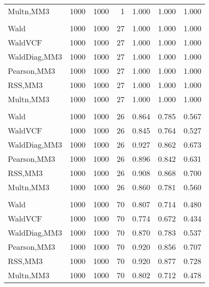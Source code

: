 \documentclass[
]{article}
\begin{document}
\begin{table}[H]
{\begin{tabular}[t]{lrrrrrr}
\hspace{1em}Multn,MM3 & 1000 & 1000 & 1 & 1.000 & 1.000 & 1.000\\
\addlinespace[0.3em]
\multicolumn{7}{l}{\textbf{1F 15V}}\\
\hspace{1em}Wald & 1000 & 1000 & 27 & 1.000 & 1.000 & 1.000\\
\hspace{1em}WaldVCF & 1000 & 1000 & 27 & 1.000 & 1.000 & 1.000\\
\hspace{1em}WaldDiag,MM3 & 1000 & 1000 & 27 & 1.000 & 1.000 & 1.000\\
\hspace{1em}Pearson,MM3 & 1000 & 1000 & 27 & 1.000 & 1.000 & 1.000\\
\hspace{1em}RSS,MM3 & 1000 & 1000 & 27 & 1.000 & 1.000 & 1.000\\
\hspace{1em}Multn,MM3 & 1000 & 1000 & 27 & 1.000 & 1.000 & 1.000\\
\addlinespace[0.3em]
\multicolumn{7}{l}{\textbf{2F 10V}}\\
\hspace{1em}Wald & 1000 & 1000 & 26 & 0.864 & 0.785 & 0.567\\
\hspace{1em}WaldVCF & 1000 & 1000 & 26 & 0.845 & 0.764 & 0.527\\
\hspace{1em}WaldDiag,MM3 & 1000 & 1000 & 26 & 0.927 & 0.862 & 0.673\\
\hspace{1em}Pearson,MM3 & 1000 & 1000 & 26 & 0.896 & 0.842 & 0.631\\
\hspace{1em}RSS,MM3 & 1000 & 1000 & 26 & 0.908 & 0.868 & 0.700\\
\hspace{1em}Multn,MM3 & 1000 & 1000 & 26 & 0.860 & 0.781 & 0.560\\
\addlinespace[0.3em]
\multicolumn{7}{l}{\textbf{3F 15V}}\\
\hspace{1em}Wald & 1000 & 1000 & 70 & 0.807 & 0.714 & 0.480\\
\hspace{1em}WaldVCF & 1000 & 1000 & 70 & 0.774 & 0.672 & 0.434\\
\hspace{1em}WaldDiag,MM3 & 1000 & 1000 & 70 & 0.870 & 0.783 & 0.537\\
\hspace{1em}Pearson,MM3 & 1000 & 1000 & 70 & 0.920 & 0.856 & 0.707\\
\hspace{1em}RSS,MM3 & 1000 & 1000 & 70 & 0.920 & 0.877 & 0.728\\
\hspace{1em}Multn,MM3 & 1000 & 1000 & 70 & 0.802 & 0.712 & 0.478\\
\bottomrule
\end{tabular}}
\endgroup{}
\end{table}
\end{document}
